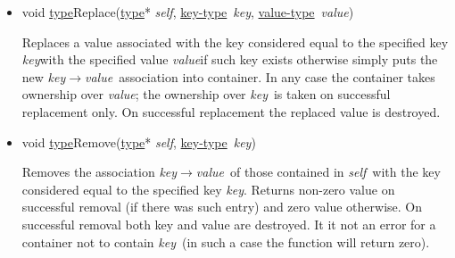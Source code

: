 \documentclass[a4paper]{article}
\newcommand{\st}{\underline{type}}
\newcommand{\kt}{\underline{key-type}}
\newcommand{\vt}{\underline{value-type}}
\newcommand{\sv}{\emph{self}}
\newcommand{\kv}{\emph{key}}
\newcommand{\vv}{\emph{value}}
\newcommand{\meth}[1]{#1}
\begin{document}
\begin{itemize}
\item \meth{void \st Replace(\st* \sv, \kt\ \kv, \vt\ \vv)}


Replaces a value associated with the key considered equal to the specified key \kv with the specified value \vv if such key exists otherwise simply puts the new \kv$\rightarrow$\vv\ association into container.
In any case the container takes ownership over \vv; the ownership over \kv\ is taken on successful replacement only.
On successful replacement the replaced value is destroyed.


\item \meth{void \st Remove(\st* \sv, \kt\ \kv)}


Removes the association \kv$\rightarrow$\vv\ of those contained in \sv\ with the key considered equal to the specified key \kv. 
Returns non-zero value on successful removal (if there was such entry) and zero value otherwise.
On successful removal both key and value are destroyed.
It it not an error for a container not to contain \kv\ (in such a case the function will return zero).


\end{itemize}
\end{document}
